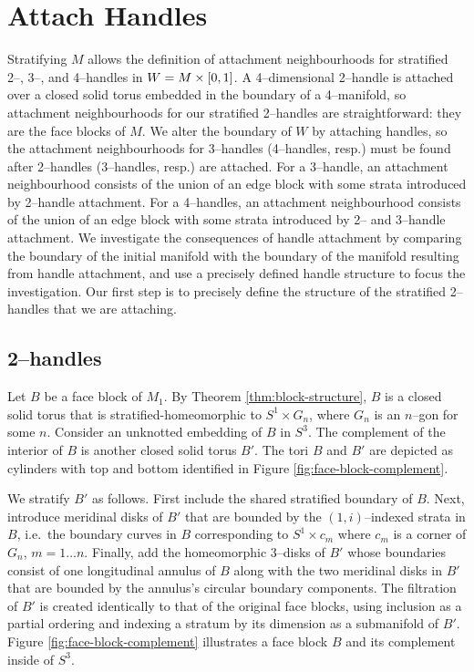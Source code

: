 \section{Attach Handles}

Stratifying $M$ allows the definition of attachment neighbourhoods for stratified 2--, 3--, and 4--handles in $W=M\times[0,1]$.
A 4--dimensional 2--handle is attached over a closed solid torus embedded in the boundary of a 4--manifold, so attachment neighbourhoods for our stratified 2--handles are straightforward: they are the face blocks of $M$.
We alter the boundary of $W$ by attaching handles, so the attachment neighbourhoods for 3--handles (4--handles, resp.) must be found after 2--handles (3--handles, resp.) are attached.
For a 3--handle, an attachment neighbourhood consists of the union of an edge block with some strata introduced by 2--handle attachment.
For a 4--handles, an attachment neighbourhood consists of the union of an edge block with some strata introduced by 2-- and 3--handle attachment.
We investigate the consequences of handle attachment by comparing the boundary of the initial manifold with the boundary of the manifold resulting from handle attachment, and use a precisely defined handle structure to focus the investigation.
Our first step is to precisely define the structure of the stratified 2--handles that we are attaching.

\subsection{2--handles}

Let $B$ be a face block of $M_1$.
By Theorem \ref{thm:block-structure}, $B$ is a closed solid torus that is stratified-homeomorphic to $S^1\times G_n$, where $G_n$ is an $n$--gon for some $n$.
Consider an unknotted embedding of $B$ in $S^3$.
The complement of the interior of $B$ is another closed solid torus $B'$.
The tori $B$ and $B'$ are depicted as cylinders with top and bottom identified in Figure \ref{fig:face-block-complement}.

We stratify $B'$ as follows.
First include the shared stratified boundary of $B$.
Next, introduce meridinal disks of $B'$ that are bounded by the $(1,i)$--indexed strata in $B$, i.e.\ the boundary curves in $B$ corresponding to $S^1\times c_m$ where $c_m$ is a corner of $G_n$, $m=1\dots n$.
Finally, add the homeomorphic 3--disks of $B'$ whose boundaries consist of one longitudinal annulus of $B$ along with the two meridinal disks in $B'$ that are bounded by the annulus's circular boundary components.
The filtration of $B'$ is created identically to that of the original face blocks, using inclusion as a partial ordering and indexing a stratum by its dimension as a submanifold of $B'$.
Figure \ref{fig:face-block-complement} illustrates a face block $B$ and its complement inside of $S^3$.

